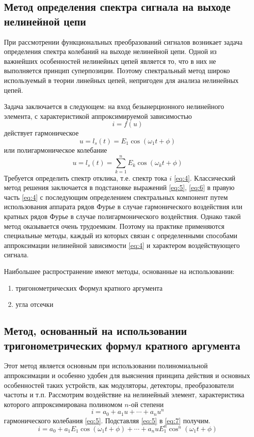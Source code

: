 \subsection{Метод определения спектра сигнала на выходе нелинейной цепи}
При рассмотрении функциональных преобразований сигналов возникает задача определения спектра колебаний на выходе нелинейной цепи. Одной из важнейших особенностей нелинейных цепей является то, что в них не выполняется принцип суперпозиции. Поэтому спектральный метод широко используемый в теории линейных цепей, непригоден для анализа нелинейных цепей.

Задача заключается в следующем: на вход безынерционного нелинейного элемента, с характеристикой аппроксимируемой зависимостью
\begin{equation}
i=f(u)
\label{eq:4}
\end{equation}
действует гармоническое
\begin{equation}
u=l_s(t)=E_1\cos(\omega_1t+\phi)
\label{eq:5}
\end{equation}
или полигармоническое колебание
\begin{equation}
u=l_s(t)=\sum_{k=1}^{n}E_k\cos(\omega_kt+\phi)
\label{eq:6}
\end{equation}
Требуется определить спектр отклика, т.е. спектр тока $i$ \eqref{eq:4}.
Классический метод решения заключается в подстановке выражений \eqref{eq:5}, \eqref{eq:6} в правую часть \eqref{eq:4} с последующим определением спектральных компонент путем использования аппарата рядов Фурье в случае гармонического воздействия или кратных рядов Фурье в случае полигармонического воздействия. Однако такой метод оказывается очень трудоемким. Поэтому на практике применяются специальные методы, каждый из которых связан с определенными способами аппроксимации нелинейной зависимости \eqref{eq:4} и характером воздействующего сигнала.

Наибольшее распространение имеют методы, основанные на использовании: 
\begin{enumerate}
	\item тригонометрических Формул кратного аргумента
	\item угла отсечки
\end{enumerate}

\subsection{Метод, основанный на использовании тригонометрических формул кратного аргумента}
Этот метод является основным при использовании полиномиальной аппроксимации и особенно удобен для выяснения принципа действия и основных особенностей таких устройств, как модуляторы, детекторы, преобразователи частоты и т.п. Рассмотрим воздействие на нелинейный элемент, характеристика которого аппроксимирована полиномом $n$-ой степени
\begin{equation}
i=a_0+a_1u+\cdots+a_nu^n
\label{eq:7}
\end{equation}
гармонического колебания \eqref{eq:5}. Подставляя \eqref{eq:5} в \eqref{eq:7} получим. 
\begin{equation}
i=a_0+a_1E_1\cos(\omega_1t+\phi)+\cdots+a_nuE_1^n\cos^n(\omega_1t+\phi)
\label{eq:8}
\end{equation}


